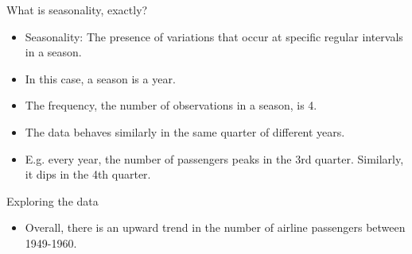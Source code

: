 \documentclass{beamer}\usepackage[]{graphicx}\usepackage[]{color}
\makeatletter
\newcommand{\hlnum}[1]{\textcolor[rgb]{0.824,0.412,0.118}{#1}}%
\newcommand{\hlstr}[1]{\textcolor[rgb]{1,0.894,0.71}{#1}}%
\newcommand{\hlcom}[1]{\textcolor[rgb]{0.824,0.706,0.549}{#1}}%
\newcommand{\hlopt}[1]{\textcolor[rgb]{1,0.894,0.769}{#1}}%
\newcommand{\hlstd}[1]{\textcolor[rgb]{1,0.894,0.769}{#1}}%
\newcommand{\hlkwb}[1]{\textcolor[rgb]{0.804,0.776,0.451}{#1}}%
\newcommand{\hlkwc}[1]{\textcolor[rgb]{0.78,0.941,0.545}{#1}}%
\newcommand{\hlkwd}[1]{\textcolor[rgb]{1,0.78,0.769}{#1}}%
\newenvironment{kframe}{%
 \def\at@end@of@kframe{}%
 \ifinner\ifhmode%
  \def\at@end@of@kframe{\end{minipage}}%
  \begin{minipage}{\columnwidth}%
 \fi\fi%
 \def\FrameCommand##1{\hskip\@totalleftmargin \hskip-\fboxsep
 \colorbox{shadecolor}{##1}\hskip-\fboxsep
     \hskip-\linewidth \hskip-\@totalleftmargin \hskip\columnwidth}%
 \MakeFramed {\advance\hsize-\width
   \@totalleftmargin\z@ \linewidth\hsize
   \@setminipage}}%
 {\par\unskip\endMakeFramed%
 \at@end@of@kframe}
\newenvironment{knitrout}{}{} %
\makeatother
\begin{document}
\begin{darkframes}
    
    
    
    \begin{frame}{What is seasonality, exactly?}
      \fontsize{9}{9}\selectfont
      
      \begin{itemize}[<+->]
        \item Seasonality: The presence of variations that occur at specific regular intervals in a season.
        \item In this case, a season is a year.
        \item The frequency, the number of observations in a season, is 4. 
        \item The data behaves similarly in the same quarter of different years.
        \item E.g. every year, the number of passengers peaks in the 3rd quarter. Similarly, it dips in the 4th quarter.
      \end{itemize}
      
    \end{frame}
    
    
    \begin{frame}[fragile]{Exploring the data}
      \fontsize{9}{9}\selectfont
        \begin{itemize}[<+->]
        \item Overall, there is an upward trend in the number of airline passengers between 1949-1960.
        

\end{itemize}
\end{frame}
\end{darkframes}
\end{document}
